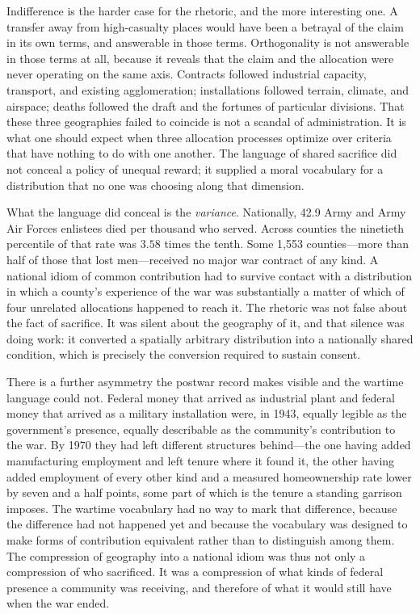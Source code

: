 \documentclass[12pt]{article}
\begin{document}
Indifference is the harder case for the rhetoric, and the more interesting one.
A transfer away from high-casualty places would have been a betrayal of the claim
in its own terms, and answerable in those terms. Orthogonality is not answerable in
those terms at all, because it reveals that the claim and the allocation were never
operating on the same axis. Contracts followed industrial capacity, transport, and
existing agglomeration; installations followed terrain, climate, and airspace;
deaths followed the draft and the fortunes of particular divisions. That these
three geographies failed to coincide is not a scandal of administration. It is what
one should expect when three allocation processes optimize over criteria that have
nothing to do with one another. The language of shared sacrifice did not conceal a
policy of unequal reward; it supplied a moral vocabulary for a distribution that no
one was choosing along that dimension.

What the language did conceal is the \emph{variance}. Nationally, 42.9 Army and
Army Air Forces enlistees died per thousand who served. Across counties the
ninetieth percentile of that rate was $3.58$ times the tenth. Some 1{,}553
counties---more than half of those that lost men---received no major war contract of
any kind. A national idiom of common contribution had to survive contact with a
distribution in which a county's experience of the war was substantially a matter
of which of four unrelated allocations happened to reach it. The rhetoric was not
false about the fact of sacrifice. It was silent about the geography of it, and
that silence was doing work: it converted a spatially arbitrary distribution into a
nationally shared condition, which is precisely the conversion required to sustain
consent.

There is a further asymmetry the postwar record makes visible and the wartime
language could not. Federal money that arrived as industrial plant and federal
money that arrived as a military installation were, in 1943, equally legible as the
government's presence, equally describable as the community's contribution to the
war. By 1970 they had left different structures behind---the one having added
manufacturing employment and left tenure where it found it, the other having
added employment of every other kind and a measured homeownership rate lower by
seven and a half points, some part of which is the tenure a standing garrison
imposes. The wartime vocabulary had no way to mark that difference, because
the difference had not happened yet and because the vocabulary was designed to
make forms of contribution equivalent rather than to distinguish among them. The
compression of geography into a national idiom was thus not only a compression of
who sacrificed. It was a compression of what kinds of federal presence a community
was receiving, and therefore of what it would still have when the war ended.
\end{document}
